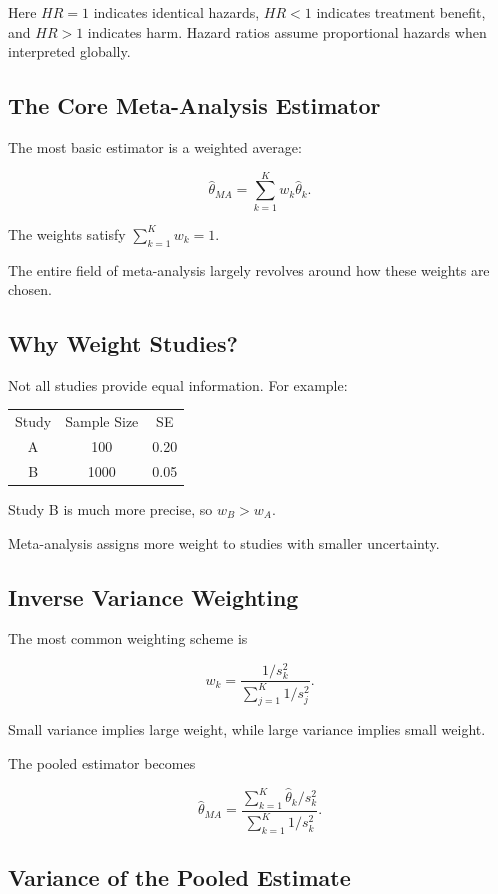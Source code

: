 \documentclass[11pt]{article}
\begin{document}
Here $HR=1$ indicates identical hazards, $HR<1$ indicates treatment benefit, and $HR>1$ indicates harm. Hazard ratios assume proportional hazards when interpreted globally.

\subsection*{The Core Meta-Analysis Estimator}

The most basic estimator is a weighted average:

\[\hat{\theta}_{MA}=\sum_{k=1}^{K}w_k\hat{\theta}_k.\]

The weights satisfy $\sum_{k=1}^{K}w_k=1$.

The entire field of meta-analysis largely revolves around how these weights are chosen.

\subsection*{Why Weight Studies?}

Not all studies provide equal information.
For example:

\begin{center}
\begin{tabular}{ccc}
Study & Sample Size & SE \\
A & 100 & 0.20 \\
B & 1000 & 0.05
\end{tabular}
\end{center}

Study B is much more precise, so $w_B>w_A$.

Meta-analysis assigns more weight to studies with smaller uncertainty.

\subsection*{Inverse Variance Weighting}

The most common weighting scheme is

\[w_k=\frac{1/s_k^2}{\sum_{j=1}^{K}1/s_j^2}.\]

Small variance implies large weight, while large variance implies small weight.

The pooled estimator becomes

\[\hat{\theta}_{MA}=\frac{\sum_{k=1}^{K}\hat{\theta}_k/s_k^2}{\sum_{k=1}^{K}1/s_k^2}.\]

\subsection*{Variance of the Pooled Estimate}
\end{document}
